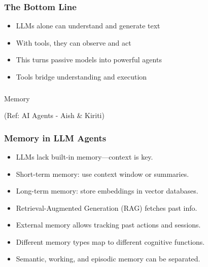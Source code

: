 \begin{frame}[fragile]\frametitle{The Bottom Line}
      \begin{itemize}
        \item LLMs alone can understand and generate text
        \item With tools, they can observe and act
        \item This turns passive models into powerful agents
        \item Tools bridge understanding and execution
      \end{itemize}
\end{frame}

\begin{frame}[fragile]\frametitle{}
\begin{center}
{\Large Memory}

{\tiny (Ref: AI Agents - Aish \& Kiriti)}
\end{center}
\end{frame}

\begin{frame}[fragile]\frametitle{Memory in LLM Agents}

      \begin{itemize}
        \item LLMs lack built-in memory—context is key.
        \item Short-term memory: use context window or summaries.
        \item Long-term memory: store embeddings in vector databases.
        \item Retrieval-Augmented Generation (RAG) fetches past info.
        \item External memory allows tracking past actions and sessions.
        \item Different memory types map to different cognitive functions.
        \item Semantic, working, and episodic memory can be separated.
      \end{itemize}

\end{frame}


